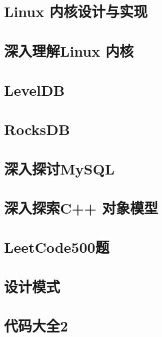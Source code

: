 \documentclass[UTF8,a4paper,12pt]{ctexbook}
\begin{document}
	\section{Linux 内核设计与实现}
	
	\section{深入理解Linux 内核}
	
	\section{LevelDB}
	
	\section{RocksDB}
	
	\section{深入探讨MySQL}
	
	\section{深入探索C++ 对象模型}
	
	\section{LeetCode500题}
	
	\section{设计模式}
	
	\section{代码大全2}
	
\end{document}
